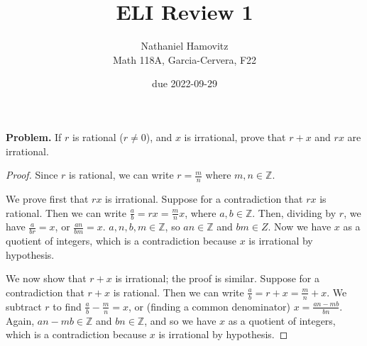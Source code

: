 \documentclass{article}
\newcommand{\Z}{\mathbb{Z}}
\begin{document}


\title{ELI Review 1} %
\author{Nathaniel Hamovitz\\Math 118A, Garcia-Cervera, F22}
\date{due 2022-09-29}

\maketitle

{\bfseries{Problem.} }
If $r$ is rational ($r \ne 0$), and $x$ is irrational, prove that $r + x$ and $rx$ are irrational.
\begin{proof}
    Since $r$ is rational, we can write $r = \frac{m}{n}$ where $m, n \in \Z$.

    We prove first that $rx$ is irrational. Suppose for a contradiction that $rx$ is rational. Then we can write $\frac{a}{b} = rx = \frac{m}{n}x$, where $a, b \in \Z$. Then, dividing by $r$, we have $\frac{a}{br} = x$, or $\frac{an}{bm} = x$. $a, n, b, m \in \Z$, so $an \in \Z$ and $bm \in Z$. Now we have $x$ as a quotient of integers, which is a contradiction because $x$ is irrational by hypothesis.

    We now show that $r + x$ is irrational; the proof is similar. Suppose for a contradiction that $r + x$ is rational. Then we can write $\frac{a}{b} = r + x = \frac{m}{n} + x$. We subtract $r$ to find $\frac{a}{b} - \frac{m}{n} = x$, or (finding a common denominator) $x = \frac{an - mb}{bn}$. Again, $an - mb \in \Z$ and $bn \in \Z$, and so we have $x$ as a quotient of integers, which is a contradiction because $x$ is irrational by hypothesis.
\end{proof}
\end{document}
